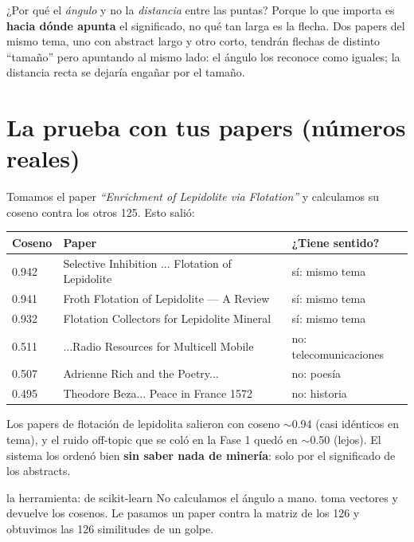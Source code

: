 \documentclass[11pt,a4paper]{article}
\begin{document}
\begin{ojo}
¿Por qué el \emph{ángulo} y no la \emph{distancia} entre las puntas? Porque lo que importa
es \textbf{hacia dónde apunta} el significado, no qué tan larga es la flecha. Dos papers del
mismo tema, uno con abstract largo y otro corto, tendrán flechas de distinto ``tamaño'' pero
apuntando al mismo lado: el ángulo los reconoce como iguales; la distancia recta se dejaría
engañar por el tamaño.
\end{ojo}

\section{La prueba con tus papers (números reales)}

Tomamos el paper \emph{``Enrichment of Lepidolite via Flotation''} y calculamos su coseno
contra los otros 125. Esto salió:

\begin{center}
\begin{tabular}{lll}
\textbf{Coseno} & \textbf{Paper} & \textbf{¿Tiene sentido?} \\
\hline
0.942 & Selective Inhibition ... Flotation of Lepidolite & sí: mismo tema \\
0.941 & Froth Flotation of Lepidolite --- A Review & sí: mismo tema \\
0.932 & Flotation Collectors for Lepidolite Mineral & sí: mismo tema \\
\hline
0.511 & ...Radio Resources for Multicell Mobile & no: telecomunicaciones \\
0.507 & Adrienne Rich and the Poetry... & no: poesía \\
0.495 & Theodore Beza... Peace in France 1572 & no: historia \\
\end{tabular}
\end{center}

Los papers de flotación de lepidolita salieron con coseno $\sim$0.94 (casi idénticos en
tema), y el ruido off-topic que se coló en la Fase 1 quedó en $\sim$0.50 (lejos). El sistema
los ordenó bien \textbf{sin saber nada de minería}: solo por el significado de los abstracts.

\begin{concepto}{la herramienta:  de scikit-learn}
No calculamos el ángulo a mano.  toma
vectores y devuelve los cosenos. Le pasamos un paper contra la matriz de los 126 y obtuvimos
las 126 similitudes de un golpe.
\end{concepto}
\end{document}
